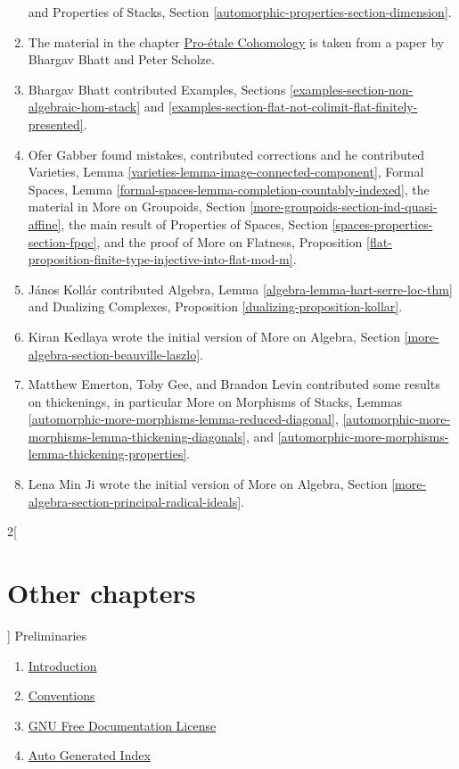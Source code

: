 \documentclass{stacks-project-book}
\theoremstyle{plain}
\theoremstyle{definition}
\theoremstyle{remark}
\numberwithin{equation}{subsection}
\begin{document}
\begin{enumerate}
and
Properties of Stacks, Section \ref{automorphic-properties-section-dimension}.
\item The material in the chapter
\hyperref[proetale-section-phantom]{Pro-\'etale Cohomology}
is taken from a paper by Bhargav Bhatt and Peter Scholze.
\item Bhargav Bhatt contributed Examples, Sections
\ref{examples-section-non-algebraic-hom-stack} and
\ref{examples-section-flat-not-colimit-flat-finitely-presented}.
\item Ofer Gabber found mistakes, contributed corrections and he
contributed
Varieties, Lemma \ref{varieties-lemma-image-connected-component},
Formal Spaces, Lemma \ref{formal-spaces-lemma-completion-countably-indexed},
the material in
More on Groupoids, Section \ref{more-groupoids-section-ind-quasi-affine},
the main result of
Properties of Spaces, Section \ref{spaces-properties-section-fpqc},
and the proof of
More on Flatness, Proposition
\ref{flat-proposition-finite-type-injective-into-flat-mod-m}.
\item J\'anos Koll\'ar contributed
Algebra, Lemma \ref{algebra-lemma-hart-serre-loc-thm} and
Dualizing Complexes, Proposition \ref{dualizing-proposition-kollar}.
\item Kiran Kedlaya wrote the initial version of
More on Algebra, Section \ref{more-algebra-section-beauville-laszlo}.
\item Matthew Emerton, Toby Gee, and Brandon Levin contributed
some results on thickenings, in particular
More on Morphisms of Stacks, Lemmas
\ref{automorphic-more-morphisms-lemma-reduced-diagonal},
\ref{automorphic-more-morphisms-lemma-thickening-diagonals}, and
\ref{automorphic-more-morphisms-lemma-thickening-properties}.
\item Lena Min Ji wrote the initial version of
More on Algebra, Section \ref{more-algebra-section-principal-radical-ideals}.
\end{enumerate}





\begin{multicols}{2}[\section{Other chapters}]
\noindent
Preliminaries
\begin{enumerate}
\item \hyperref[introduction-section-phantom]{Introduction}
\item \hyperref[conventions-section-phantom]{Conventions}
\item \hyperref[fdl-section-phantom]{GNU Free Documentation License}
\item \hyperref[index-section-phantom]{Auto Generated Index}
\end{enumerate}
\end{multicols}
\end{document}
